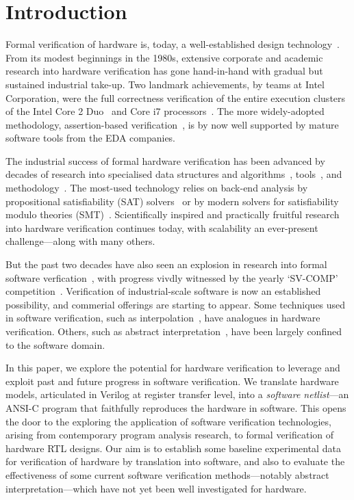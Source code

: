 \section{Introduction}\label{sec:intro}
%
Formal verification of hardware is, today, a well-established design technology~\cite{Seligman:2015:FV}. From its modest beginnings in the 1980s, extensive corporate and academic research into hardware verification has gone hand-in-hand with gradual but sustained industrial take-up. Two landmark achievements, by teams at Intel Corporation, were the full correctness verification of the entire execution clusters of the Intel Core 2 Duo~\cite{Core2} and Core i7 processors~\cite{i7}. The more widely-adopted methodology,
assertion-based verification~\cite{Foster:2009:AAB}, is by now well supported by mature software tools from the EDA companies.

The industrial success of formal hardware verification has been advanced by decades of research into specialised data structures and algorithms~\cite{vis}, tools~\cite{Seger:2005:IEE,abc}, and methodology~\cite{MCMILLAN2000279,Aagaard:2000:MLH}. The most-used technology relies on back-end analysis by propositional satisfiability (SAT) solvers~\cite{Biere1999} or by modern solvers for satisfiability modulo theories (SMT)~\cite{decision_procedures, DBLP:conf/lpar/AndrausLS08,soc-keating,
DBLP:conf/mtv/SunkariCVM07,DBLP:conf/cav/Bjesse08}. Scientifically inspired and practically fruitful research into hardware verification continues today, with scalability an ever-present challenge---along with many others. 

But the past two decades have also seen an explosion in research into formal software verfication~\cite{dkw2008}, with progress vivdly witnessed by the yearly `SV-COMP' competition~\cite{Beyer2017}.  Verification of industrial-scale software is now an established possibility, and commerial offerings are starting to appear. Some techniques used in software verification, such as interpolation~\cite{}, have analogues in hardware verification. Others, such as abstract interpretation~\cite{}, have been largely confined to the software domain.  

In this paper, we explore the potential for hardware verification to leverage and exploit past and future progress in software verification. We translate hardware models, articulated in Verilog at register transfer level, into 
a \emph{software netlist}---an ANSI-C program that faithfully reproduces the hardware in software. This opens the door to the exploring the application of software verification technologies, arising from contemporary program analysis research, to formal verification of hardware RTL designs. Our aim is to establish some baseline experimental data for verification of hardware by translation into software, and also to evaluate the effectiveness of some current software verification methods---notably abstract interpretation---which have not yet been well investigated for hardware.

